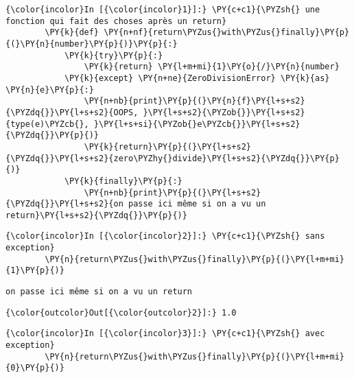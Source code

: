     \begin{Verbatim}[commandchars=\\\{\},frame=single,framerule=0.3mm,rulecolor=\color{cellframecolor}]
{\color{incolor}In [{\color{incolor}1}]:} \PY{c+c1}{\PYZsh{} une fonction qui fait des choses après un return}
        \PY{k}{def} \PY{n+nf}{return\PYZus{}with\PYZus{}finally}\PY{p}{(}\PY{n}{number}\PY{p}{)}\PY{p}{:}
            \PY{k}{try}\PY{p}{:}
                \PY{k}{return} \PY{l+m+mi}{1}\PY{o}{/}\PY{n}{number}
            \PY{k}{except} \PY{n+ne}{ZeroDivisionError} \PY{k}{as} \PY{n}{e}\PY{p}{:}
                \PY{n+nb}{print}\PY{p}{(}\PY{n}{f}\PY{l+s+s2}{\PYZdq{}}\PY{l+s+s2}{OOPS, }\PY{l+s+s2}{\PYZob{}}\PY{l+s+s2}{type(e)\PYZcb{}, }\PY{l+s+si}{\PYZob{}e\PYZcb{}}\PY{l+s+s2}{\PYZdq{}}\PY{p}{)}
                \PY{k}{return}\PY{p}{(}\PY{l+s+s2}{\PYZdq{}}\PY{l+s+s2}{zero\PYZhy{}divide}\PY{l+s+s2}{\PYZdq{}}\PY{p}{)}
            \PY{k}{finally}\PY{p}{:}
                \PY{n+nb}{print}\PY{p}{(}\PY{l+s+s2}{\PYZdq{}}\PY{l+s+s2}{on passe ici même si on a vu un return}\PY{l+s+s2}{\PYZdq{}}\PY{p}{)}
\end{Verbatim}


    \begin{Verbatim}[commandchars=\\\{\},frame=single,framerule=0.3mm,rulecolor=\color{cellframecolor}]
{\color{incolor}In [{\color{incolor}2}]:} \PY{c+c1}{\PYZsh{} sans exception}
        \PY{n}{return\PYZus{}with\PYZus{}finally}\PY{p}{(}\PY{l+m+mi}{1}\PY{p}{)}
\end{Verbatim}


    \begin{Verbatim}[commandchars=\\\{\},frame=single,framerule=0.3mm,rulecolor=\color{cellframecolor}]
on passe ici même si on a vu un return
\end{Verbatim}

\begin{Verbatim}[commandchars=\\\{\},frame=single,framerule=0.3mm,rulecolor=\color{cellframecolor}]
{\color{outcolor}Out[{\color{outcolor}2}]:} 1.0
\end{Verbatim}
            
    \begin{Verbatim}[commandchars=\\\{\},frame=single,framerule=0.3mm,rulecolor=\color{cellframecolor}]
{\color{incolor}In [{\color{incolor}3}]:} \PY{c+c1}{\PYZsh{} avec exception}
        \PY{n}{return\PYZus{}with\PYZus{}finally}\PY{p}{(}\PY{l+m+mi}{0}\PY{p}{)}
\end{Verbatim}


